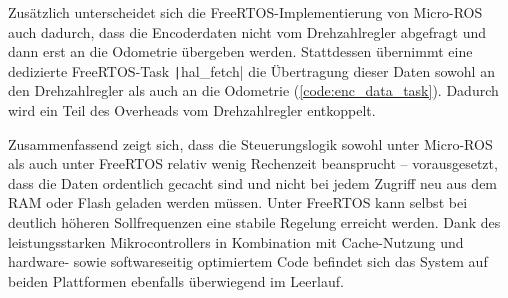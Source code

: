 Zusätzlich unterscheidet sich die FreeRTOS-Implementierung von Micro-ROS auch
dadurch, dass die Encoderdaten nicht vom Drehzahlregler abgefragt und dann erst
an die Odometrie übergeben werden. Stattdessen übernimmt eine dedizierte
FreeRTOS-Task \texttt|hal_fetch| die Übertragung dieser Daten sowohl an
den Drehzahlregler als auch an die Odometrie (\ref{code:enc_data_task}). Dadurch
wird ein Teil des Overheads vom Drehzahlregler entkoppelt.

Zusammenfassend zeigt sich, dass die Steuerungslogik sowohl unter Micro-ROS als
auch unter FreeRTOS relativ wenig Rechenzeit beansprucht -- vorausgesetzt, dass
die Daten ordentlich gecacht sind und nicht bei jedem Zugriff neu aus dem RAM
oder Flash geladen werden müssen. Unter FreeRTOS kann selbst bei deutlich
höheren Sollfrequenzen eine stabile Regelung erreicht werden. Dank des
leistungsstarken Mikrocontrollers in Kombination mit Cache-Nutzung und hardware-
sowie softwareseitig optimiertem Code befindet sich das System auf beiden
Plattformen ebenfalls überwiegend im Leerlauf.
